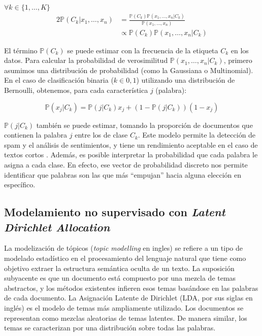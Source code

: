 \documentclass[
	spanish, %
	letterpaper, oneside
]{article}
\begin{document}
$\forall k \in \{1,\dots,K\}$
\begin{alignat*}{2}
    \mathbb{P}(C_k|x_1,\dots,x_n) & = \displaystyle\frac{\mathbb{P}(C_k)\mathbb{P}(x_1,\dots,x_n|C_k)}{\mathbb{P}(x_1,\dots,x_n)}\\
                                    & \propto \mathbb{P}(C_k)\mathbb{P}(x_1,\dots,x_n|C_k)
\end{alignat*}

El término $\mathbb{P}(C_k)$ se puede estimar con la frecuencia de la etiqueta $C_k$ en los datos. Para calcular la probabilidad de verosimilitud $\mathbb{P}(x_1,\dots,x_n|C_k)$, primero asumimos una distribución de probabilidad (como la Gaussiana o Multinomial). En el caso de clasificación binaria ($k\in{0,1}$) utilizando una distribución de Bernoulli, obtenemos, para cada característica $j$ (palabra):

$$ \mathbb{P}(x_j|C_k) = \mathbb{P}(j|C_k)x_j + (1-\mathbb{P}(j|C_k))(1-x_j)$$

$\mathbb{P}(j|C_k)$ también se puede estimar, tomando la proporción de documentos que contienen la palabra $j$ entre los de clase $C_k$. Este modelo permite la detección de spam y el análisis de sentimientos, y tiene un rendimiento aceptable en el caso de textos cortos \cite{bayes}. Además, es posible interpretar la probabilidad que cada palabra le asigna a cada clase. En efecto, ese vector de probabilidad discreto nos permite identificar que palabras son las que más ``empujan'' hacia alguna elección en específico.


\subsection{Modelamiento no supervisado con \textit{Latent Dirichlet Allocation}}


La modelización de tópicos (\textit{topic modelling} en ingles) se refiere a un tipo de modelado estadístico en el procesamiento del lenguaje natural que tiene como objetivo extraer la estructura semántica oculta de un texto. La suposición subyacente es que un documento está compuesto por una mezcla de temas abstractos, y los métodos existentes infieren esos temas basándose en las palabras de cada documento. La Asignación Latente de Dirichlet (LDA, por sus siglas en inglés) es el modelo de temas más ampliamente utilizado. Los documentos se representan como mezclas aleatorias de temas latentes. De manera similar, los temas se caracterizan por una distribución sobre todas las palabras.
\end{document}
